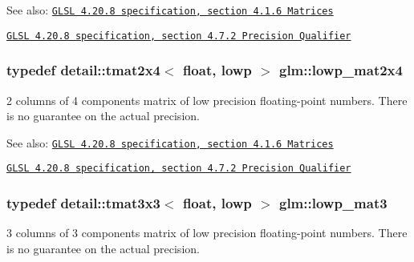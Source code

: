 \begin{Desc}
\item[See also:]\href{http://www.opengl.org/registry/doc/GLSLangSpec.4.20.8.pdf}{\tt GLSL 4.20.8 specification, section 4.1.6 Matrices} 

\href{http://www.opengl.org/registry/doc/GLSLangSpec.4.20.8.pdf}{\tt GLSL 4.20.8 specification, section 4.7.2 Precision Qualifier} \end{Desc}
\hypertarget{group__core__precision_ga62e33ee2864909c8522a549fbf40ce5}{
\subsubsection[lowp\_\-mat2x4]{\setlength{\rightskip}{0pt plus 5cm}typedef detail::tmat2x4$<$ float, lowp $>$ {\bf glm::lowp\_\-mat2x4}}}
\label{group__core__precision_ga62e33ee2864909c8522a549fbf40ce5}


2 columns of 4 components matrix of low precision floating-point numbers. There is no guarantee on the actual precision.

\begin{Desc}
\item[See also:]\href{http://www.opengl.org/registry/doc/GLSLangSpec.4.20.8.pdf}{\tt GLSL 4.20.8 specification, section 4.1.6 Matrices} 

\href{http://www.opengl.org/registry/doc/GLSLangSpec.4.20.8.pdf}{\tt GLSL 4.20.8 specification, section 4.7.2 Precision Qualifier} \end{Desc}
\hypertarget{group__core__precision_gae2935658c6a3668ac1935a7f6064d51}{
\subsubsection[lowp\_\-mat3]{\setlength{\rightskip}{0pt plus 5cm}typedef detail::tmat3x3$<$ float, lowp $>$ {\bf glm::lowp\_\-mat3}}}
\label{group__core__precision_gae2935658c6a3668ac1935a7f6064d51}


3 columns of 3 components matrix of low precision floating-point numbers. There is no guarantee on the actual precision.

